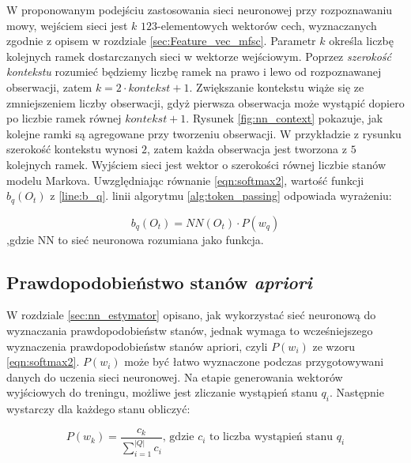 \documentclass[11pt]{article}
\begin{document}
		 W proponowanym podejściu zastosowania sieci neuronowej przy rozpoznawaniu mowy, wejściem sieci jest $k$ $123$-elementowych wektorów cech, wyznaczanych zgodnie z opisem w rozdziale \ref{sec:Feature_vec_mfsc}. Parametr $k$ określa liczbę kolejnych ramek dostarczanych sieci w wektorze wejściowym. Poprzez \textit{szerokość kontekstu} rozumieć będziemy liczbę ramek na prawo i lewo od rozpoznawanej obserwacji, zatem $k = 2 \cdot kontekst + 1$. Zwiększanie kontekstu wiąże się ze zmniejszeniem liczby obserwacji, gdyż pierwsza obserwacja może wystąpić dopiero po liczbie ramek równej $kontekst + 1$. Rysunek \ref{fig:nn_context} pokazuje, jak kolejne ramki są agregowane przy tworzeniu obserwacji. W przykładzie z rysunku szerokość kontekstu wynosi $2$, zatem każda obserwacja jest tworzona z $5$ kolejnych ramek. Wyjściem sieci jest wektor o szerokości równej liczbie stanów modelu Markova. Uwzględniając równanie \ref{eqn:softmax2}, wartość funkcji $b_q(O_t)$ z \ref{line:b_q}. linii algorytmu \ref{alg:token_passing} odpowiada wyrażeniu:
		 
		 \begin{equation}
			 b_q(O_t) = NN(O_t) \cdot P(w_q)			 
		 \end{equation}
		 ,gdzie NN to sieć neuronowa rozumiana jako funkcja.
		
	\subsection{Prawdopodobieństwo stanów \textit{apriori} }
		W rozdziale \ref{sec:nn_estymator} opisano, jak wykorzystać sieć neuronową do wyznaczania prawdopodobieństw stanów, jednak wymaga to wcześniejszego wyznaczenia prawdopodobieństw stanów apriori, czyli $P(w_i)$ ze wzoru \ref{eqn:softmax2}. 
		$P(w_i)$ może być łatwo wyznaczone podczas przygotowywani danych do uczenia sieci neuronowej. Na etapie generowania wektorów wyjściowych do treningu, możliwe jest zliczanie wystąpień stanu $q_i$.
		Następnie wystarczy dla każdego stanu obliczyć:
		
		\begin{equation}
			P(w_k) = \frac{c_k}{\sum_{i=1}^{|Q|} c_i}
			\text{,   gdzie $c_i$ to liczba wystąpień stanu $q_i$}
		\end{equation}
		
\end{document}
